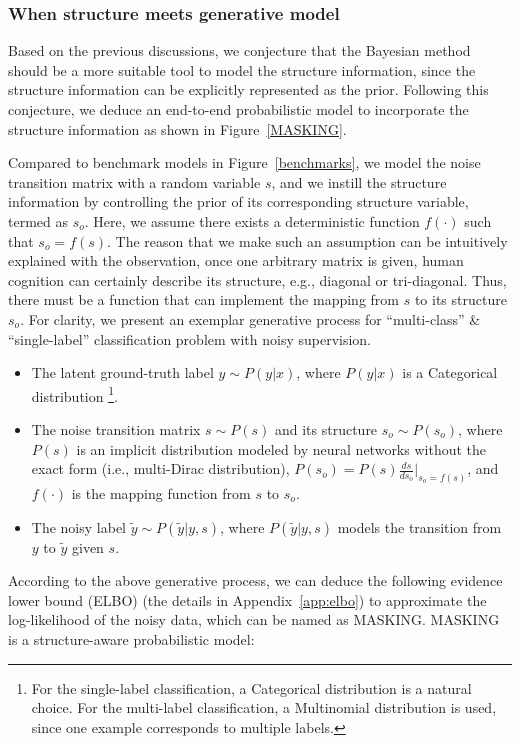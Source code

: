 \documentclass{article}
\begin{document}
\subsubsection{When structure meets generative model}\label{end-to-end-model}


Based on the previous discussions, we conjecture that the Bayesian method should be a more suitable tool to model the structure information, since the structure information can be explicitly represented as the prior. Following this conjecture, we deduce an end-to-end probabilistic model to incorporate the structure information as shown in Figure~\ref{MASKING}.

Compared to benchmark models in Figure~\ref{benchmarks}, we model the noise transition matrix with a random variable $s$, and we instill the structure information by controlling the prior of its corresponding structure variable, termed as $s_o$. Here, we assume there exists a deterministic function $f(\cdot)$ such that $s_o=f(s)$. The reason that we make such an assumption can be intuitively explained with the observation, once one arbitrary matrix is given, human cognition can certainly describe its structure, e.g., diagonal or tri-diagonal. Thus, there must be a function that can implement the mapping from $s$ to its structure $s_o$. For clarity, we present an exemplar generative process for ``multi-class'' \& ``single-label'' classification problem with noisy supervision.
\begin{itemize}
\setlength\itemsep{0.1em}
\item The latent ground-truth label $y\sim P(y|x)$, where $P(y|x)$ is a Categorical distribution \footnote{For the single-label classification, a Categorical distribution is a natural choice. For the multi-label classification, a Multinomial distribution is used, since one example corresponds to multiple labels.}.
\item The noise transition matrix $s \sim P(s)$ and its structure $s_o\sim P(s_o)$, where $P(s)$ is an implicit distribution modeled by neural networks without the exact form (i.e., multi-Dirac distribution),  $P(s_o)=P(s)\frac{ds}{ds_o}\big|_{s_o=f(s)}$, and $f(\cdot)$ is the mapping function from $s$ to $s_o$.
\item The noisy label $\tilde{y}\sim P(\tilde{y}|y,s)$, where $P(\tilde{y}|y,s)$ models the transition from $y$ to $\tilde{y}$ given $s$.
\end{itemize}
According to the above generative process, we can deduce the following evidence lower bound (ELBO) (the details in Appendix~\ref{app:elbo}) to approximate the log-likelihood of the noisy data, which can be named as MASKING. MASKING is a structure-aware probabilistic model:
\end{document}
